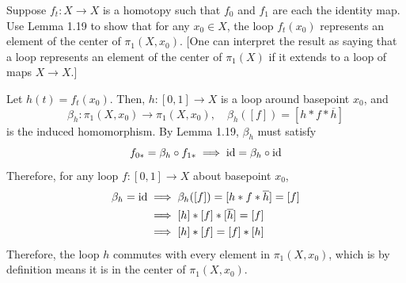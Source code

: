 	\begin{exercise}[Hatcher 1.1.20]
		Suppose $f_t : X \to X$ is a homotopy such that $f_0$ and $f_1$ are each the identity map. Use Lemma 1.19 to show that for any $x_0 \in X$, the loop $f_t(x_0)$ represents an element of the center of $\pi_1(X, x_0)$. [One can interpret the result as saying that a loop represents an element of the center of $\pi_1(X)$ if it extends to a loop of maps $X \to X$.]
	\end{exercise}
	\begin{solution}
		Let $h(t) = f_t (x_0)$. Then, $h: [0, 1] \to X$ is a loop around basepoint $x_0$, and 
		\begin{equation}
			\beta_h : \pi_1 (X, x_0) \to \pi_1(X, x_0), \quad \beta_h ([f]) = [h \ast f \ast \overline{h}]
		\end{equation}
		is the induced homomorphism. By Lemma 1.19, $\beta_h$ must satisfy 
		\begin{equation}
			f_{0 \ast} = \beta_h \circ f_{1 \ast} \implies \operatorname{id} = \beta_h \circ \operatorname{id}
		\end{equation}
		Therefore, for any loop $f: [0, 1] \to X$ about basepoint $x_0$, 
		\begin{align}
			\beta_h = \operatorname{id} & \implies \beta_h ([f]) = [h \ast f \ast \overline{h}] = [f] \\ 
										& \implies [h] \ast [f] \ast [\overline{h}] = [f] \\ 
										& \implies [h] \ast [f] = [f] \ast [h]
		\end{align}
		Therefore, the loop $h$ commutes with every element in $\pi_1 (X, x_0)$, which is by definition means it is in the center of $\pi_1 (X, x_0)$. 
	\end{solution}

